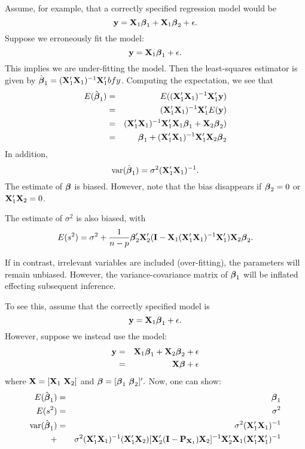 Assume, for example, that a correctly specified regression model would be
$$\mathbf{y} =\mathbf{X}_1 \boldsymbol{\beta}_1 + \mathbf{X}_1 \boldsymbol{\beta}_2 + \epsilon.$$
Suppose we erroneously fit the model:
$$\mathbf{y} =\mathbf{X}_1 {\mbox{\boldmath $\beta$}_1} + \epsilon.$$ This implies we are under-fitting the model.
Then the least-squares estimator is given by ${{\hat {\mbox{\boldmath $\beta$}}_1}} = (\mathbf{X}_1'\mathbf{X}_1)^{-1} \mathbf{X}_1' bfy$.
Computing the expectation, we see that 
\begin{eqnarray*}
E({{\hat {\mbox{\boldmath $\beta$}}_1}}) &=&E( (\mathbf{X}_1'\mathbf{X}_1)^{-1} \mathbf{X}_1' \mathbf{y})\\
&=& (\mathbf{X}_1' \mathbf{X}_1)^{-1} \mathbf{X}_1' E(\mathbf{y})\\
&=& (\mathbf{X}_1' \mathbf{X}_1)^{-1} \mathbf{X}_1' \mathbf{X}_1 \mbox{\boldmath $\beta$}_1 + \mathbf{X}_2 \mbox{\boldmath $\beta$}_2)\\
&=& \mbox{\boldmath $\beta$}_1  + (\mathbf{X}_1' \mathbf{X}_1)^{-1} \mathbf{X}_1' \mathbf{X}_2 \mbox{\boldmath $\beta$}_2
\end{eqnarray*}
In addition,  $$\mathrm{var}(\hat {\mbox{\boldmath $\beta$}}_1) = \sigma^2 (\mathbf{X}_1' \mathbf{X}_1)^{-1}.$$
The estimate of $\mbox{\boldmath $\beta$}$ is biased. However, note that the bias disappears if $\mbox{\boldmath $\beta$}_2=0$ or $\mathbf{X}_1' \mathbf{X}_2=0$. 

The estimate of $\sigma^2$ is also biased, with $$E(s^2) = \sigma^2 + \frac{1}{n-p}  \boldsymbol{\beta}_2' \mathbf{X}_2' (\mathbf{I} - \mathbf{X}_1 (\mathbf{X}_1' \mathbf{X}_1)^{-1} \mathbf{X}_1') \mathbf{X}_2 \boldsymbol{\beta}_2.$$

If in contrast, irrelevant variables are included (over-fitting), the parameters will remain unbiased.
However, the variance-covariance matrix of $\mbox{\boldmath $\beta$}_1$ will be inflated effecting subsequent inference.

To see this, assume that the correctly specified model is
$$\mathbf{y} =\mathbf{X}_1 {\mbox{\boldmath $\beta$}_1} + \epsilon.$$
However, suppose we instead use the model:
\begin{eqnarray*}
\mathbf{y} &=& \mathbf{X}_1 \mbox{\boldmath $\beta$}_1 + \mathbf{X}_2 \mbox{\boldmath $\beta$}_2 + \epsilon \\
&=& \mathbf{X} \mbox{\boldmath $\beta$} + \epsilon 
\end{eqnarray*}
where $\mathbf{X} = [\mathbf{X}_1 \, \, \mathbf{X}_2]$ and $\mbox{\boldmath $\beta$} = [\mbox{\boldmath $\beta$}_1 \, \, \mbox{\boldmath $\beta$}_2]'.$
Now, one can show:
\begin{eqnarray*}
E({\hat {\mbox{\boldmath $\beta$}}_1}) &=& \mbox{\boldmath $\beta$}_1\\
E(s^2) &=& \sigma^2\\
\mathrm{var}({\hat {\mbox{\boldmath $\beta$}}_1}) &=& \sigma^2 (\mathbf{X}_1' \mathbf{X}_1)^{-1} \\
+   && \sigma^2(\mathbf{X}_1' \mathbf{X}_1)^{-1}(\mathbf{X}_1' \mathbf{X}_2)[\mathbf{X}_2' (\mathbf{I}-\mathbf{P}_{\mathbf{X}_1} )\mathbf{X}_2]^{-1} \mathbf{X}_2' \mathbf{X}_1 (\mathbf{X}_1' \mathbf{X}_1')^{-1}
\end{eqnarray*}

